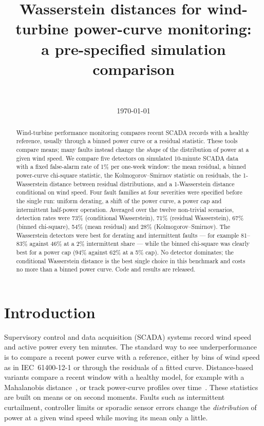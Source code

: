 \documentclass[11pt]{article}
\title{Wasserstein distances for wind-turbine power-curve monitoring:\\ a pre-specified simulation comparison}
\author{\authorname\\ \small \affiliation}
\date{\today}
\begin{document}
\maketitle

\begin{abstract}
Wind-turbine performance monitoring compares recent SCADA records with a healthy reference, usually through a binned
power curve or a residual statistic. These tools compare means; many faults instead change the \emph{shape} of the
distribution of power at a given wind speed. We compare five detectors on simulated 10-minute SCADA data with a fixed
false-alarm rate of 1\% per one-week window: the mean residual, a binned power-curve chi-square statistic, the
Kolmogorov--Smirnov statistic on residuals, the 1-Wasserstein distance between residual distributions, and a
1-Wasserstein distance conditional on wind speed. Four fault families at four severities were specified before the
single run: uniform derating, a shift of the power curve, a power cap and intermittent half-power operation.
Averaged over the twelve non-trivial scenarios, detection rates were 73\% (conditional Wasserstein), 71\% (residual
Wasserstein), 67\% (binned chi-square), 54\% (mean residual) and 28\% (Kolmogorov--Smirnov). The Wasserstein detectors
were best for derating and intermittent faults --- for example 81--83\% against 46\% at a 2\% intermittent share ---
while the binned chi-square was clearly best for a power cap (94\% against 62\% at a 5\% cap). No detector dominates;
the conditional Wasserstein distance is the best single choice in this benchmark and costs no more than a binned
power curve. Code and results are released.
\end{abstract}

\section{Introduction}
Supervisory control and data acquisition (SCADA) systems record wind speed and active power every ten minutes. The
standard way to see underperformance is to compare a recent power curve with a reference, either by bins of wind speed
as in IEC~61400-12-1 or through the residuals of a fitted curve. Distance-based variants compare a recent window with
a healthy model, for example with a Mahalanobis distance~\cite{Guo2022}, or track power-curve profiles over
time~\cite{Ding}. These statistics are built on means or on second moments. Faults such as intermittent curtailment,
controller limits or sporadic sensor errors change the \emph{distribution} of power at a given wind speed while
moving its mean only a little.
\end{document}
